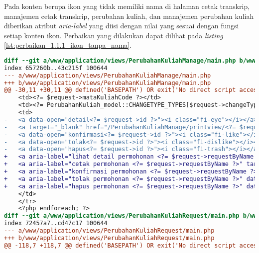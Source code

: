Pada konten berupa ikon yang tidak memiliki nama di halaman cetak transkrip, manajemen cetak transkrip, perubahan kuliah, dan manajemen perubahan kuliah diberikan atribut \textit{aria-label} yang diisi dengan nilai yang sesuai dengan fungsi setiap konten ikon. Perbaikan yang dilakukan dapat dilihat pada \textit{listing} \ref{lst:perbaikan_1.1.1_ikon_tanpa_nama}.
\begin{lstlisting}[frame=single, label={lst:perbaikan_1.1.1_ikon_tanpa_nama}, language=diff, caption=Perbaikan Kriteria Sukses 1.1.1 - Ikon Tanpa Nama]
diff --git a/www/application/views/PerubahanKuliahManage/main.php b/www/application/views/PerubahanKuliahManage/main.php
index 657260b..43c215f 100644
--- a/www/application/views/PerubahanKuliahManage/main.php
+++ b/www/application/views/PerubahanKuliahManage/main.php
@@ -30,11 +30,11 @@ defined('BASEPATH') OR exit('No direct script access allowed');
    <td><?= $request->mataKuliahCode ?></td>
    <td><?= PerubahanKuliah_model::CHANGETYPE_TYPES[$request->changeType] ?></td>
    <td>
-   <a data-open="detail<?= $request->id ?>"><i class="fi-eye"></i></a>
-   <a target="_blank" href="/PerubahanKuliahManage/printview/<?= $request->id ?>"><i class="fi-print"></i></a>
-   <a data-open="konfirmasi<?= $request->id ?>"><i class="fi-like"></i></a>                                    
-   <a data-open="tolak<?= $request->id ?>"><i class="fi-dislike"></i></a>
-   <a data-open="hapus<?= $request->id ?>"><i class="fi-trash"></i></a>
+   <a aria-label="lihat detail permohonan <?= $request->requestByName ?>" data-open="detail<?= $request->id ?>"><i class="fi-eye"></i></a>
+   <a aria-label="cetak permohonan <?= $request->requestByName ?>" target="_blank" href="/PerubahanKuliahManage/printview/<?= $request->id ?>"><i class="fi-print"></i></a>
+   <a aria-label="konfirmasi permohonan <?= $request->requestByName ?>" data-open="konfirmasi<?= $request->id ?>"><i class="fi-like"></i></a>
+   <a aria-label="tolak permohonan <?= $request->requestByName ?>" data-open="tolak<?= $request->id ?>"><i class="fi-dislike"></i></a>
+   <a aria-label="hapus permohonan <?= $request->requestByName ?>" data-open="hapus<?= $request->id ?>"><i class="fi-trash"></i></a>
    </td>
    </tr>
    <?php endforeach; ?>
diff --git a/www/application/views/PerubahanKuliahRequest/main.php b/www/application/views/PerubahanKuliahRequest/main.php
index 72457a7..cd47c17 100644
--- a/www/application/views/PerubahanKuliahRequest/main.php
+++ b/www/application/views/PerubahanKuliahRequest/main.php
@@ -118,7 +118,7 @@ defined('BASEPATH') OR exit('No direct script access allowed');

\end{lstlisting}
